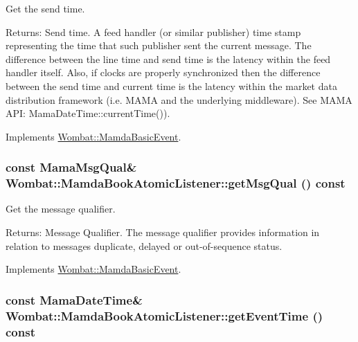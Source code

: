 Get the send time. 

\begin{Desc}
\item[Returns:]Send time. A feed handler (or similar publisher) time stamp representing the time that such publisher sent the current message. The difference between the line time and send time is the latency within the feed handler itself. Also, if clocks are properly synchronized then the difference between the send time and current time is the latency within the market data distribution framework (i.e. MAMA and the underlying middleware). See MAMA API: Mama\-Date\-Time::current\-Time()). \end{Desc}


Implements \hyperlink{classWombat_1_1MamdaBasicEvent_b0602a83bec20cd8b341ec866ff3bffa}{Wombat::Mamda\-Basic\-Event}.\hypertarget{classWombat_1_1MamdaBookAtomicListener_f51b3cfbfefe29104627fe7fec17f1a2}{
\subsubsection[getMsgQual]{\setlength{\rightskip}{0pt plus 5cm}const Mama\-Msg\-Qual\& Wombat::Mamda\-Book\-Atomic\-Listener::get\-Msg\-Qual () const}}
\label{classWombat_1_1MamdaBookAtomicListener_f51b3cfbfefe29104627fe7fec17f1a2}


Get the message qualifier. 

\begin{Desc}
\item[Returns:]Message Qualifier. The message qualifier provides information in relation to messages duplicate, delayed or out-of-sequence status. \end{Desc}


Implements \hyperlink{classWombat_1_1MamdaBasicEvent_675ce8f1de581548426335423d6b3864}{Wombat::Mamda\-Basic\-Event}.\hypertarget{classWombat_1_1MamdaBookAtomicListener_b84977f1c114cc2841c34e0d0efa9055}{
\subsubsection[getEventTime]{\setlength{\rightskip}{0pt plus 5cm}const Mama\-Date\-Time\& Wombat::Mamda\-Book\-Atomic\-Listener::get\-Event\-Time () const}}
\label{classWombat_1_1MamdaBookAtomicListener_b84977f1c114cc2841c34e0d0efa9055}



